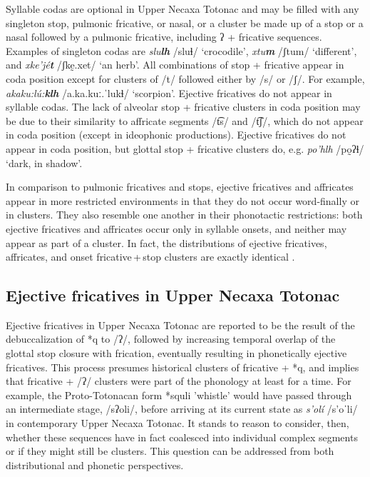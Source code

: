 \documentclass[output=paper,colorlinks,citecolor=brown]{langscibook}
\begin{document}
Syllable codas are optional in Upper Necaxa Totonac and may be filled with any singleton stop, pulmonic fricative, or nasal, or a cluster be made up of a stop or a nasal followed by a pulmonic fricative, including ʔ + fricative sequences. Examples of singleton codas are \textit{slu\textbf{lh}} {/sluɬ/} `crocodile', \textit{xtu\textbf{m}} {/ʃtum/} `different', and \textit{xke'jé\textbf{t}} {/ʃkḛ.xet/} `an herb'. All combinations of stop + fricative appear in coda position except for clusters of /t/ followed either by {/s/} or /ʃ/. For example, \textit{akaku:lú:\textbf{klh}} {/a.ka.kuː.ˈlukɬ/} `scorpion'. Ejective fricatives do not appear in syllable codas. The lack of alveolar stop + fricative clusters in coda position may be due to their similarity to affricate segments {/t͡s/} and {/t͡ʃ/}, which do not appear in coda position (except in ideophonic productions). Ejective fricatives do not appear in coda position, but glottal stop + fricative clusters do, e.g. \textit{po'hlh} {/po̰ʔɬ/} `dark, in shadow'.

In comparison to pulmonic fricatives and stops, ejective fricatives and affricates appear in more restricted environments in that they do not occur word-finally or in clusters. They also resemble one another in their phonotactic restrictions: both ejective fricatives and affricates occur only in syllable onsets, and neither may appear as part of a cluster. In fact, the distributions of ejective fricatives, affricates, and onset fricative\,+\,stop clusters are exactly identical \citep{Kirchner2002,Beck2006}.

\subsection{Ejective fricatives in Upper Necaxa Totonac}\label{section:EFsUNT}
Ejective fricatives in Upper Necaxa Totonac are reported to be the result of the debuccalization of *q to /ʔ/, followed by increasing temporal overlap of the glottal stop closure with frication, eventually resulting in phonetically ejective fricatives. This process presumes historical clusters of fricative + *q, and implies that fricative + /ʔ/ clusters were part of the phonology at least for a time. For example, the Proto-Totonacan form *squli 'whistle' would have passed through an intermediate stage, {/sʔoli/}, before arriving at its current state as \textit{s’olí} {/s'oˈli/} in contemporary Upper Necaxa Totonac. It stands to reason to consider, then, whether these sequences have in fact coalesced into individual complex segments or if they might still be clusters. This question can be addressed from both distributional and phonetic perspectives.
\end{document}
